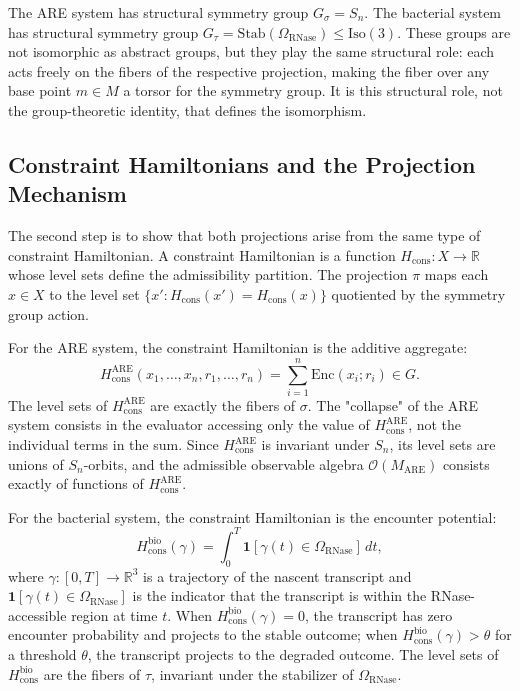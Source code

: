 \documentclass[12pt, a4paper]{article}
\theoremstyle{essaystyle}
\begin{document}
The ARE system has structural symmetry group $G_\sigma = S_n$. The bacterial system has
structural symmetry group $G_\tau = \mathrm{Stab}(\Omega_{\mathrm{RNase}})
\leq \mathrm{Iso}(3)$. These groups are not isomorphic as abstract groups, but they
play the same structural role: each acts freely on the fibers of the respective
projection, making the fiber over any base point $m \in M$ a torsor for the symmetry
group. It is this structural role, not the group-theoretic identity, that defines the
isomorphism.

\subsection{Constraint Hamiltonians and the Projection Mechanism}

The second step is to show that both projections arise from the same type of constraint
Hamiltonian. A constraint Hamiltonian is a function $H_{\mathrm{cons}} : X \to \mathbb{R}$
whose level sets define the admissibility partition. The projection $\pi$ maps each
$x \in X$ to the level set $\{x' : H_{\mathrm{cons}}(x') = H_{\mathrm{cons}}(x)\}$
quotiented by the symmetry group action.

For the ARE system, the constraint Hamiltonian is the additive aggregate:
\[
H_{\mathrm{cons}}^{\mathrm{ARE}}(x_1, \ldots, x_n, r_1, \ldots, r_n)
= \sum_{i=1}^n \mathrm{Enc}(x_i; r_i) \in G.
\]
The level sets of $H_{\mathrm{cons}}^{\mathrm{ARE}}$ are exactly the fibers of $\sigma$.
The "collapse" of the ARE system consists in the evaluator accessing only the value of
$H_{\mathrm{cons}}^{\mathrm{ARE}}$, not the individual terms in the sum. Since
$H_{\mathrm{cons}}^{\mathrm{ARE}}$ is invariant under $S_n$, its level sets are unions
of $S_n$-orbits, and the admissible observable algebra $\mathcal{O}(M_{\mathrm{ARE}})$
consists exactly of functions of $H_{\mathrm{cons}}^{\mathrm{ARE}}$.

For the bacterial system, the constraint Hamiltonian is the encounter potential:
\[
H_{\mathrm{cons}}^{\mathrm{bio}}(\gamma)
= \int_0^T \mathbf{1}[\gamma(t) \in \Omega_{\mathrm{RNase}}]\, dt,
\]
where $\gamma : [0, T] \to \mathbb{R}^3$ is a trajectory of the nascent transcript
and $\mathbf{1}[\gamma(t) \in \Omega_{\mathrm{RNase}}]$ is the indicator that the
transcript is within the RNase-accessible region at time $t$. When
$H_{\mathrm{cons}}^{\mathrm{bio}}(\gamma) = 0$, the transcript has zero encounter
probability and projects to the stable outcome; when
$H_{\mathrm{cons}}^{\mathrm{bio}}(\gamma) > \theta$ for a threshold $\theta$,
the transcript projects to the degraded outcome. The level sets of
$H_{\mathrm{cons}}^{\mathrm{bio}}$ are the fibers of $\tau$, invariant under the
stabilizer of $\Omega_{\mathrm{RNase}}$.
\end{document}
